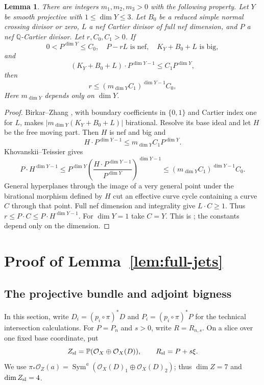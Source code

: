 \documentclass[12pt,a4paper,psamsfonts]{amsart}
\theoremstyle{definition}
\theoremstyle{plain}
\newtheorem{lemma}{Lemma}[section]
\newcommand{\OO}{\mathcal O}
\begin{document}
\begin{lemma}\label{lem:bounded-curves}
There are integers $m_1,m_2,m_3>0$ with the following property.
Let $Y$ be smooth projective with $1\le\dim Y\le3$. Let $B_0$ be a reduced simple normal crossing
divisor or zero, $L$ a nef Cartier divisor of full nef dimension,
and $P$ a nef $\mathbb{Q}$-Cartier divisor. Let $r,C_0,C_1>0$. If
\[
 0<P^{\dim Y}\le C_0,\quad P-rL\text{ is nef},\quad
 K_Y+B_0+L\text{ is big},
\]
and
\[
 (K_Y+B_0+L)\cdot P^{\dim Y-1}\le C_1P^{\dim Y},
\]
then
\[
 r\le(m_{\dim Y}C_1)^{\dim Y-1}C_0,
\]
Here $m_{\dim Y}$ depends only on $\dim Y$.
\end{lemma}
\begin{proof}
Birkar--Zhang \cite[Theorem~1.3]{BZ}, with boundary coefficients
in $\{0,1\}$ and Cartier index one for $L$, makes
$|m_{\dim Y}(K_Y+B_0+L)|$ birational. Resolve its base ideal and let
$H$ be the free moving part. Then $H$ is nef and big and
\[
 H\cdot P^{\dim Y-1}\le m_{\dim Y}C_1P^{\dim Y}.
\]
Khovanskii--Teissier gives
\[
 P\cdot H^{\dim Y-1}\le P^{\dim Y}
 \left(\frac{H\cdot P^{\dim Y-1}}{P^{\dim Y}}\right)^{\dim Y-1}
 \le(m_{\dim Y}C_1)^{\dim Y-1}C_0.
\]
General hyperplanes through the image of a very general point
under the birational morphism defined by $H$ cut an effective
curve cycle containing a curve $C$ through that point.
Full nef dimension and integrality give $L\cdot C\ge1$.
Thus $r\le P\cdot C\le P\cdot H^{\dim Y-1}$. For $\dim Y=1$ take $C=Y$.
This is \cite[Lemma~4.1]{NS}; the constants depend only on the dimension.
\end{proof}

\section{Proof of Lemma~\ref{lem:full-jets}}\label{sec:large-jets}



\subsection{The projective bundle and adjoint bigness}

In this section, write $D_i=(p_i\circ\pi)^*D$ and
$P_i=(p_i\circ\pi)^*P$ for the technical intersection calculations.
For $P=P_n$ and $s>0$, write $R=R_{n,s}$. On a slice over one fixed
base coordinate, put
\[
 Z_{\rm sl}=\mathbb P(\OO_X\oplus\OO_X(D)),\qquad
 R_{\rm sl}=P+s\xi.
\]
We use $\pi_*\OO_Z(a)=\operatorname{Sym}^a
(\OO_X(D)_1\oplus\OO_X(D)_2)$; thus $\dim Z=7$ and
$\dim Z_{\rm sl}=4$.
\end{document}
